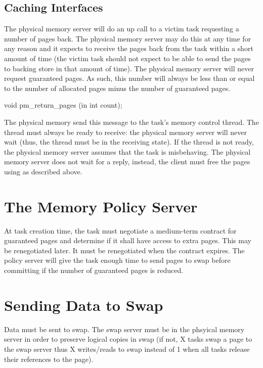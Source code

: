 \subsection{Caching Interfaces}

The physical memory server will do an up call to a victim task
requesting a number of pages back.  The physical memory server may do
this at any time for any reason and it expects to receive the pages
back from the task within a short amount of time (the victim task
should not expect to be able to send the pages to backing store in
that amount of time).  The physical memory server will never request
guaranteed pages.  As such, this number will always be less than or
equal to the number of allocated pages minus the number of guaranteed
pages.

\begin{code}
void pm\_return\_pages (in int count);
\end{code}

The physical memory send this message to the task's memory control
thread.  The thread must always be ready to receive: the physical
memory server will never wait (thus, the thread must be in the
receiving state).  If the thread is not ready, the physical memory
server assumes that the task is misbehaving.  The physical memory
server does not wait for a reply, instead, the client must free the
pages using  as described above.

\section{The Memory Policy Server}

At task creation time, the task must negotiate a medium-term contract
for guaranteed pages and determine if it shall have access to extra
pages.  This may be renegotiated later.  It must be renegotiated when
the contract expires.  The policy server will give the task enough
time to send pages to swap before committing if the number of
guaranteed pages is reduced.

\section{Sending Data to Swap}

Data must be sent to swap.  The swap server must be in the phsyical
memory server in order to preserve logical copies in swap (if not, X
tasks swap a page to the swap server thus X writes/reads to swap
instead of 1 when all tasks release their references to the page).

